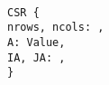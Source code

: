 \begin{myquote}\small{\texttt{\\
\Bsig CSR \{\\
\TA nrows, ncols: \Bint,\\
\TA A: \Bseq Value,\\
\TA IA, JA: \Bseq \Bint,\\
\}
}}
\end{myquote}